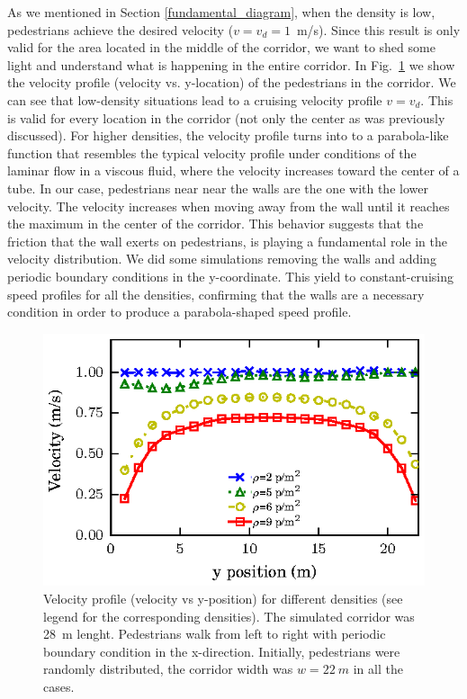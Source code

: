  As we mentioned in Section \ref{fundamental_diagram}, when the density is low, pedestrians achieve the desired velocity ($v=v_d=1$~m/s). Since this result is only valid for the area located in the middle of the corridor, we want to shed some light and understand what is happening in the entire corridor. In Fig.~\ref{speed-profile-w22} we show the velocity profile (velocity vs. y-location) of the pedestrians in the  corridor. We can see that low-density situations lead to a cruising velocity profile $v=v_d$. This is valid for every location in the corridor (not only the center as was previously discussed). For higher densities, the velocity profile turns into to a parabola-like function that resembles the typical velocity profile under conditions of the laminar flow in a viscous fluid, where the velocity increases toward the center of a tube. In our case, pedestrians near near the walls are the one with the lower velocity. The velocity increases when moving away from the wall until it reaches the maximum in the center of the corridor. This behavior suggests that the friction that the wall exerts on pedestrians, is playing a fundamental role in the velocity distribution. We did some simulations removing the walls and adding periodic boundary conditions in the y-coordinate. This yield to constant-cruising speed profiles for all the densities, confirming that the walls are a necessary condition in order to produce a parabola-shaped speed profile.

\begin{figure}[htbp!]
\includegraphics[width=\columnwidth]
{plots/v(y)_width22_k24.eps}
\caption{\label{speed-profile-w22} Velocity profile (velocity vs y-position) for different densities (see legend for the corresponding densities). The simulated corridor was 28~m lenght. Pedestrians walk from left to right with periodic boundary condition in the x-direction. Initially, pedestrians were randomly distributed, the corridor width was $w = 22~m$ in all the cases. }
\end{figure}

